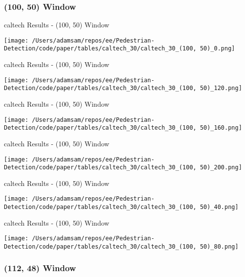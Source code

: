 
\subsubsection*{(100, 50) Window}

\begin{table}
    \caption{caltech Results - (100, 50) Window}
    \texttt{[image: /Users/adamsam/repos/ee/Pedestrian-Detection/code/paper/tables/caltech\_30/caltech\_30\_(100, 50)\_0.png]}
    \label{tab:caltech_30_(100, 50)_0}
\end{table}

\begin{table}
    \caption{caltech Results - (100, 50) Window}
    \texttt{[image: /Users/adamsam/repos/ee/Pedestrian-Detection/code/paper/tables/caltech\_30/caltech\_30\_(100, 50)\_120.png]}
    \label{tab:caltech_30_(100, 50)_120}
\end{table}

\begin{table}
    \caption{caltech Results - (100, 50) Window}
    \texttt{[image: /Users/adamsam/repos/ee/Pedestrian-Detection/code/paper/tables/caltech\_30/caltech\_30\_(100, 50)\_160.png]}
    \label{tab:caltech_30_(100, 50)_160}
\end{table}

\begin{table}
    \caption{caltech Results - (100, 50) Window}
    \texttt{[image: /Users/adamsam/repos/ee/Pedestrian-Detection/code/paper/tables/caltech\_30/caltech\_30\_(100, 50)\_200.png]}
    \label{tab:caltech_30_(100, 50)_200}
\end{table}

\begin{table}
    \caption{caltech Results - (100, 50) Window}
    \texttt{[image: /Users/adamsam/repos/ee/Pedestrian-Detection/code/paper/tables/caltech\_30/caltech\_30\_(100, 50)\_40.png]}
    \label{tab:caltech_30_(100, 50)_40}
\end{table}

\begin{table}
    \caption{caltech Results - (100, 50) Window}
    \texttt{[image: /Users/adamsam/repos/ee/Pedestrian-Detection/code/paper/tables/caltech\_30/caltech\_30\_(100, 50)\_80.png]}
    \label{tab:caltech_30_(100, 50)_80}
\end{table}

\subsubsection*{(112, 48) Window}

